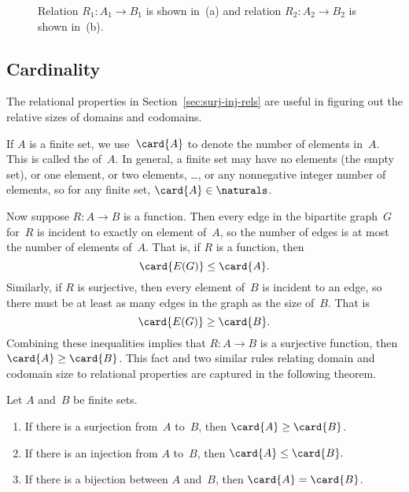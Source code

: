 \begin{figure}


\qquad
{}

\caption{Relation $R_1: A_1 \to B_1$ is shown in~(a) and relation
  $R_2: A_2 \to B_2$ is shown in~(b).}

\label{fig:7FD}

\end{figure}

\subsection{Cardinality}

The relational properties in Section~\ref{sec:surj-inj-rels} are
useful in figuring out the relative sizes of domains and codomains.

If $A$ is a finite set, we use~$\card{A}$ to denote the number of
elements in~$A$.  This is called the  of~$A$.  In
general, a finite set may have no elements (the empty set), or one
element, or two elements, \dots, or any nonnegative integer number of
elements, so for any finite set, $\card{A} \in \naturals$.

Now suppose $R: A \to B$ is a function.  Then every edge in the
bipartite graph~$G$ for~$R$ is incident to exactly on element of~$A$,
so the number of edges is at most the number of elements of~$A$.  That
is, if $R$ is a function, then
\begin{equation*}
    \card{E(G)} \le \card{A}.
\end{equation*}
Similarly, if $R$ is surjective, then every element of~$B$ is incident
to an edge, so there must be at least as many edges in the graph as
the size of~$B$.  That is
\begin{equation*}
    \card{E(G)} \ge \card{B}.
\end{equation*}
Combining these inequalities implies that $R : A \to B$ is a
surjective function, then $\card{A} \ge \card{B}$.  This fact and two
similar rules relating domain and codomain size to relational
properties are captured in the following theorem.

\begin{theorem}\label{thm:relational_rules}\label{thm:PA}
Let $A$ and~$B$ be finite sets.
\begin{enumerate}

\item\label{mr:1}
If there is a surjection from~$A$ to~$B$, then $\card{A} \ge
\card{B}$.

\item\label{mapping-inj}
If there is an injection from $A$ to~$B$, then $\card{A} \le
\card{B}.$

\item\label{mr:3}
If there is a bijection between $A$ and~$B$, then $\card{A} =
\card{B}$.

\end{enumerate}
\end{theorem}

